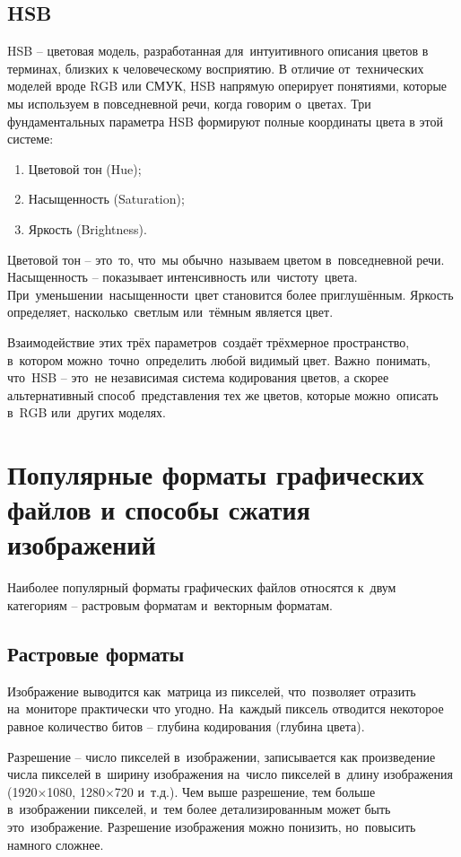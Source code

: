 \documentclass{ou}
\begin{document}
\subsection{HSB}
HSB -- цветовая модель, разработанная для~интуитивного описания цветов в терминах, близких к человеческому восприятию. В отличие от~технических моделей вроде RGB или СМУК, HSB напрямую оперирует понятиями, которые мы используем в повседневной речи, когда говорим о~цветах. Три фундаментальных параметра HSB формируют полные координаты цвета в этой системе: 
\begin{enumerate}[leftmargin=0em, itemindent=3.75em, nosep, label=\arabic*)]
\item Цветовой тон (Hue);
\item Насыщенность (Saturation);
\item Яркость (Brightness).
\end{enumerate}

Цветовой тон -- это~то, что~мы обычно~называем цветом в~повседневной речи. Насыщенность -- показывает интенсивность или~чистоту~цвета. При~уменьшении~насыщенности~цвет становится более приглушённым. Яркость определяет, насколько~светлым или~тёмным является цвет. 

Взаимодействие этих трёх параметров~создаёт трёхмерное пространство, в~котором можно~точно~определить любой видимый цвет. Важно~понимать, что~HSB -- это~не независимая система кодирования цветов, а скорее альтернативный способ~представления тех же цветов, которые можно~описать в~RGB или~других моделях.
\newpage
\section{Популярные форматы графических файлов и способы сжатия изображений}
Наиболее популярный форматы графических файлов относятся к~двум категориям -- растровым форматам и~векторным форматам.
\subsection{Растровые форматы}
Изображение выводится как~матрица из пикселей, что~позволяет отразить на~мониторе практически что угодно. На~каждый пиксель отводится некоторое равное количество битов -- глубина кодирования (глубина цвета). 

Разрешение -- число пикселей в~изображении, записывается как произведение числа пикселей в~ширину изображения на~число пикселей в~длину изображения (1920×1080, 1280×720 и~т.д.). Чем выше разрешение, тем больше в~изображении пикселей, и~тем более детализированным может быть это~изображение. Разрешение изображения можно понизить, но~повысить намного сложнее.
\end{document}
